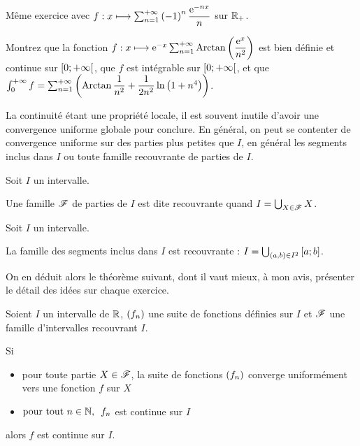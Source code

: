 \begin{exo}
Même exercice avec \(f:x\longmapsto\sum_{n=1}^{+\infty}\left(-1\right)^n\dfrac{\mathrm{e}^{-nx}}{n}\) sur \(\mathbb{R}_+\).
\end{exo}

\begin{exo}
Montrez que la fonction \(f:x\longmapsto\mathrm{e}^{-x}\sum_{n=1}^{+\infty}\operatorname{Arctan}\left(\dfrac{\mathrm{e}^{x}}{n^2}\right)\) est bien définie et continue sur \(\left[0;+\infty\right[\), que \(f\) est intégrable sur \(\left[0;+\infty\right[\), et que \(\int_0^{+\infty}f=\sum_{n=1}^{+\infty}\left(\operatorname{Arctan}\dfrac{1}{n^2}+\dfrac{1}{2n^2}\ln\left(1+n^4\right)\right)\).
\end{exo}

La continuité étant une propriété locale, il est souvent inutile d'avoir une convergence uniforme globale pour conclure. En général, on peut se contenter de convergence uniforme sur des parties plus petites que \(I\), en général les segments inclus dans \(I\) ou toute famille recouvrante de parties de \(I\).

\begin{defi}
Soit \(I\) un intervalle.

Une famille \(\mathscr{F}\) de parties de \(I\) est dite recouvrante quand \(I=\bigcup_{X\in\mathscr{F}}X\).
\end{defi}

\begin{prop}
Soit \(I\) un intervalle.

La famille des segments inclus dans \(I\) est recouvrante : \(I=\bigcup_{\left(a,b\right)\in I^2}\left[a;b\right]\).
\end{prop}

On en déduit alors le théorème suivant, dont il vaut mieux, à mon avis, présenter le détail des idées sur chaque exercice.

\begin{theo}
Soient \(I\) un intervalle de \(\mathbb{R}\), \(\left(f_n\right)\) une suite de fonctions définies sur \(I\) et \(\mathscr{F}\) une famille d'intervalles recouvrant \(I\).

Si

\begin{itemize}
    \item pour toute partie \(X\in\mathscr{F}\), la suite de fonctions \(\left(f_n\right)\) converge uniformément vers une fonction \(f\) sur \(X\) \\
    \item \(\quantifs{\tpt n\in\N}f_n\) est continue sur \(I\)
\end{itemize}

alors \(f\) est continue sur \(I\).
\end{theo}


